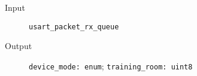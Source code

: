\begin{flushleft}
  \begin{description}
    \item [Input]
      \verb#usart_packet_rx_queue#
    \item [Output]
      \verb#device_mode: enum#;
      \verb#training_room: uint8#
  \end{description}
\end{flushleft}
